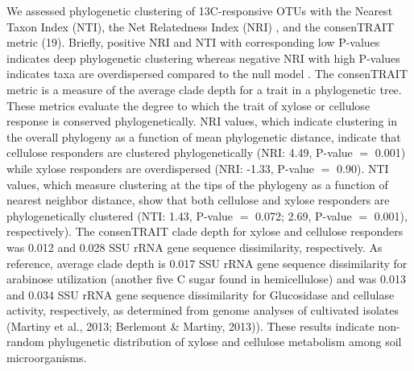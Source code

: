 We assessed phylogenetic clustering of 13C-responsive OTUs with the Nearest
Taxon Index (NTI), the Net Relatedness Index (NRI) \citep{Webb2000}, and the consenTRAIT
metric (19). Briefly, positive NRI and NTI with corresponding low P-values
indicates deep phylogenetic clustering whereas negative NRI with high P-values
indicates taxa are overdispersed compared to the null model \citep{Evans2014a}.
The consenTRAIT metric is a measure of the average clade depth for a trait
in a phylogenetic tree. These metrics evaluate the degree to which the trait of
xylose or cellulose response is conserved phylogenetically. NRI values, which
indicate clustering in the overall phylogeny as a function of mean phylogenetic
distance, indicate that cellulose responders are clustered phylogenetically
(NRI: 4.49, P-value $=$ 0.001) while xylose responders are overdispersed (NRI: -1.33,
P-value $=$ 0.90). NTI values, which measure clustering at the tips of the phylogeny as
a function of nearest neighbor distance, show that both cellulose and xylose
responders are phylogenetically clustered (NTI: 1.43, P-value $=$ 0.072; 2.69,
P-value $=$ 0.001), respectively). The consenTRAIT clade depth for xylose and cellulose
responders was 0.012 and 0.028 SSU rRNA gene sequence dissimilarity,
respectively. As reference, average clade depth is 0.017 SSU rRNA gene sequence
dissimilarity for arabinose utilization (another five C sugar found in
hemicellulose) and was 0.013 and 0.034 SSU rRNA gene sequence dissimilarity for
Glucosidase and cellulase activity, respectively, as determined from genome
analyses of cultivated isolates \citep{Martiny2013} (Martiny et al., 2013;
Berlemont & Martiny, 2013)). These results indicate non-random phylugenetic
distribution of xylose and cellulose metabolism among soil microorganisms.





